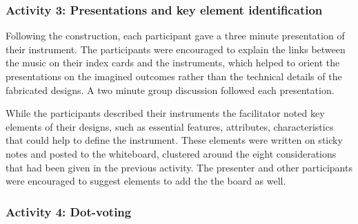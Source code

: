 \documentclass[letterpaper, 12pt]{article}
\begin{document}


\subsubsection{Activity 3: Presentations and key element identification}
\label{sec:activity-3-presentations}

Following the construction, each participant gave a three minute presentation of their instrument. 
The participants were encouraged to explain the links between the music on their index cards and the instruments, which helped to orient the presentations on the imagined outcomes rather than the technical details of the fabricated designs. A two minute group discussion followed each presentation. 

While the participants described their instruments the facilitator noted key elements of their designs, such as essential features, attributes, characteristics that could help to define the instrument. These elements were written on sticky notes and posted to the whiteboard, clustered around the eight considerations that had been given in the previous activity. The presenter and other participants were encouraged to suggest elements to add the the board as well. 

\subsubsection{Activity 4: Dot-voting}
\label{sec:activity-4-dot-voting}
\end{document}
